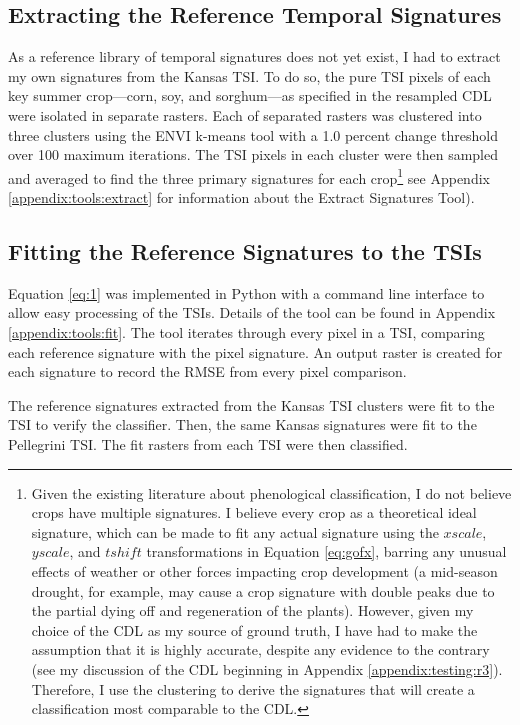 \subsection{Extracting the Reference Temporal Signatures}

As a reference library of temporal signatures does not yet exist, I had to extract my own signatures from the Kansas TSI. To do so, the pure TSI pixels of each key summer crop---corn, soy, and sorghum---as specified in the resampled CDL were isolated in separate rasters. Each of separated rasters was clustered into three clusters using the ENVI  k-means tool with a 1.0 percent change threshold over 100 maximum iterations. The TSI pixels in each cluster were then sampled and averaged to find the three primary signatures for each crop\footnote{Given the existing literature about phenological classification, I do not believe crops have multiple signatures. I believe every crop as a theoretical ideal signature, which can be made to fit any actual signature using the $xscale$, $yscale$, and $tshift$ transformations in Equation \ref{eq:gofx}, barring any unusual effects of weather or other forces impacting crop development (a mid-season drought, for example, may cause a crop signature with double peaks due to the partial dying off and regeneration of the plants). However, given my choice of the CDL as my source of ground truth, I have had to make the assumption that it is highly accurate, despite any evidence to the contrary (see my discussion of the CDL beginning in Appendix \ref{appendix:testing:r3}). Therefore, I use the clustering to derive the signatures that will create a classification most comparable to the CDL.} see Appendix \ref{appendix:tools:extract} for information about the Extract Signatures Tool).

\subsection{Fitting the Reference Signatures to the TSIs}

Equation \ref{eq:1} was implemented in Python with a command line interface to allow easy processing of the TSIs. Details of the tool can be found in Appendix \ref{appendix:tools:fit}. The tool iterates through every pixel in a TSI, comparing each reference signature with the pixel signature. An output raster is created for each signature to record the RMSE from every pixel comparison.

The reference signatures extracted from the Kansas TSI clusters were fit to the TSI to verify the classifier. Then, the same Kansas signatures were fit to the Pellegrini TSI. The fit rasters from each TSI were then classified. 

